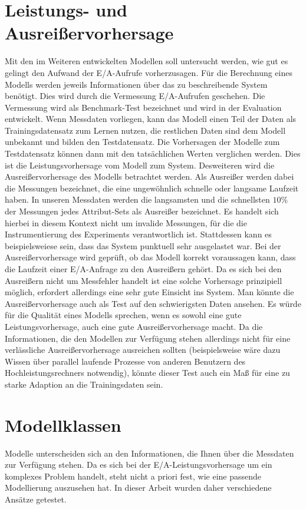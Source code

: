 \documentclass[
	12pt,
	a4paper,
	BCOR10mm,
	DIV14,
	listof=totoc,
	bibliography=totoc,
	headsepline
]{scrreprt}
\begin{document}
\section{Leistungs- und Ausreißervorhersage}
Mit den im Weiteren entwickelten Modellen soll untersucht werden, wie gut es gelingt den Aufwand der E/A-Aufrufe vorherzusagen. 
Für die Berechnung eines Modells werden jeweils Informationen über das zu beschreibende System benötigt. Dies wird durch die Vermessung E/A-Aufrufen geschehen.
Die Vermessung wird als Benchmark-Test bezeichnet und wird in der Evaluation entwickelt. 
Wenn Messdaten vorliegen, kann das Modell einen Teil der Daten als Trainingsdatensatz zum Lernen nutzen, die restlichen Daten sind dem Modell unbekannt und bilden den Testdatensatz. Die Vorhersagen der Modelle zum Testdatensatz können dann mit den tatsächlichen Werten verglichen werden. Dies ist die Leistungsvorhersage vom Modell zum System. 
Desweiteren wird die Ausreißervorhersage des Modells betrachtet werden. Als Ausreißer werden dabei die Messungen bezeichnet, die eine ungewöhnlich schnelle oder langsame Laufzeit haben. In unseren Messdaten werden die langsamsten und die schnellsten $10\%$ der Messungen jedes Attribut-Sets als Ausreißer bezeichnet. Es handelt sich hierbei in diesem Kontext nicht um invalide Messungen, für die die Instrumentierung des Experiments verantwortlich ist. Stattdessen kann es beispielsweiese sein, dass das System punktuell sehr ausgelastet war. 
Bei der Ausreißervorhersage wird geprüft, ob das Modell korrekt voraussagen kann, dass die Laufzeit einer E/A-Anfrage zu den Ausreißern gehört. Da es sich bei den Ausreißern nicht um Messfehler handelt ist eine solche Vorhersage prinzipiell möglich, erfordert allerdings eine sehr gute Einsicht ins System.
Man könnte die Ausreißervorhersage auch als Test auf den schwierigsten Daten ansehen. 
Es würde für die Qualität eines Modells sprechen, wenn es sowohl eine gute Leistungsvorhersage, auch eine gute Ausreißervorhersage macht. Da die Informationen, die den Modellen zur Verfügung stehen allerdings nicht für eine verlässliche Ausreißervorhersage ausreichen sollten (beispielsweise wäre dazu Wissen über parallel laufende Prozesse von anderen Benutzern des Hochleistungsrechners notwendig), könnte dieser Test auch ein Maß für eine zu starke Adaption an die Trainingsdaten sein.

\section{Modellklassen}
Modelle unterscheiden sich an den Informationen, die Ihnen über die Messdaten zur Verfügung stehen.
Da es sich bei der E/A-Leistungsvorhersage um ein komplexes Problem handelt, steht nicht a priori fest, wie eine passende Modellierung auszusehen hat. 
In dieser Arbeit wurden daher verschiedene Ansätze getestet.
\end{document}
